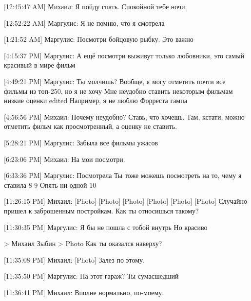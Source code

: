\documentclass{article}
\begin{document}
[12:45:47 AM] Михаил:
Я пойду спать. Спокойной тебе ночи.

[12:52:22 AM] Маргулис:
Я не помню, что я смотрела

[1:21:52 AM] Маргулис:
Посмотри бойцовую рыбку. Это важно

[4:15:37 PM] Маргулис:
А ещё посмотри выживут только любовники, это самый красивый в мире фильм

[4:49:21 PM] Маргулис:
Ты молчишь?
 Вообще, я могу отметить почти все фильмы из топ-250, но я не хочу
 Мне неудобно ставить некоторым фильмам низкие оценки
edited 
Например, я не люблю Форреста гампа

[4:56:56 PM] Михаил:
Почему неудобно? Ставь, что хочешь. Там, кстати, можно отметить фильм как просмотренный, а оценку не ставить.

[5:28:21 PM] Маргулис:
Забыла все фильмы ужасов

[6:23:06 PM] Михаил:
На мои посмотри.

[6:33:36 PM] Маргулис:
Посмотрела
 Ты тоже можешь посмотреть на то, чему я ставила 8-9
 Опять ни одной 10

[11:26:15 PM] Михаил:
[Photo]
 [Photo]
 [Photo]
 [Photo]
 [Photo]
 [Photo]
 Случайно пришел к заброшенным постройкам. Как ты относишься такому?

[11:30:35 PM] Маргулис:
Я бы не пошла с тобой внутрь
 Но красиво
 
> Михаил Зыбин
>  Photo
Как ты оказался наверху?

[11:35:08 PM] Михаил:
[Photo]
 Залез по этому.

[11:35:50 PM] Маргулис:
На этот гараж?
 Ты сумасшедший

[11:36:41 PM] Михаил:
Вполне нормально, по-моему.
\end{document}
